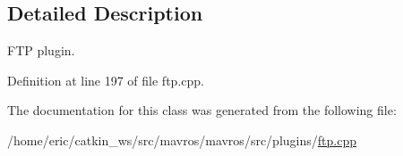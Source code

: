 \subsection{Detailed Description}
F\+TP plugin. 

Definition at line 197 of file ftp.\+cpp.



The documentation for this class was generated from the following file\+:\begin{DoxyCompactItemize}
\item 
/home/eric/catkin\+\_\+ws/src/mavros/mavros/src/plugins/\mbox{\hyperlink{ftp_8cpp}{ftp.\+cpp}}\end{DoxyCompactItemize}

